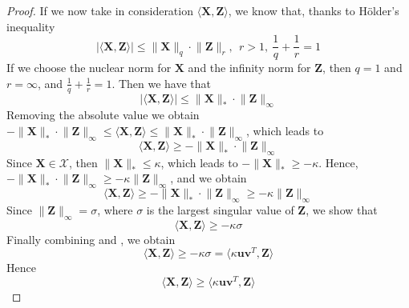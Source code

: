 \documentclass[12pt]{article}
\newcommand{\boldZ}{\mathbf{Z}}
\newcommand{\boldX}{\mathbf{X}}
\newcommand{\setX}{\mathcal{X}}
\newcommand{\boldu}{\mathbf{u}}
\newcommand{\boldv}{\mathbf{v}}
\begin{document}
\begin{proof}
If we now take in consideration $\langle \boldX, \boldZ \rangle$, we know that, thanks to H{\"o}lder's inequality
\begin{equation}
    \lvert \langle \boldX, \boldZ \rangle \rvert \leq \lVert \boldX \rVert_{q} \cdot \lVert \boldZ \rVert_{r}, \ \ r > 1, \ \frac{1}{q} + \frac{1}{r} = 1
\end{equation}
If we choose the nuclear norm for $\boldX$ and the infinity norm for $\boldZ$, then $q = 1$ and $r = \infty$, and $\frac{1}{q} + \frac{1}{r} = 1$. Then we have that
\begin{equation}
    \lvert \langle \boldX, \boldZ \rangle \rvert \leq \lVert \boldX \rVert_{*} \cdot \lVert \boldZ \rVert_{\infty}
\end{equation}
Removing the absolute value we obtain $-\lVert \boldX \rVert_{*} \cdot \lVert \boldZ \rVert_{\infty} \leq \langle \boldX, \boldZ \rangle \leq \lVert \boldX \rVert_{*} \cdot \lVert \boldZ \rVert_{\infty}$, which leads to
\begin{equation}
    \langle \boldX, \boldZ \rangle \geq - \lVert \boldX \rVert_{*} \cdot \lVert \boldZ \rVert_{\infty}
\end{equation}
Since $\boldX \in \setX$, then $\lVert \boldX \rVert_{*} \leq \kappa$, which leads to $-\lVert \boldX \rVert_{*} \geq -\kappa$. Hence, $-\lVert \boldX \rVert_{*} \cdot \lVert \boldZ \rVert_{\infty} \geq -\kappa \lVert \boldZ \rVert_{\infty}$, and we obtain
\begin{equation}
    \langle \boldX, \boldZ \rangle \geq -\lVert \boldX \rVert_{*} \cdot \lVert \boldZ \rVert_{\infty} \geq -\kappa \lVert \boldZ \rVert_{\infty}
\end{equation}
Since $\lVert \boldZ \rVert_{\infty} = \sigma$, where $\sigma$ is the largest singular value of $\boldZ$, we show that
\begin{equation} \label{eq:inner-x-z}
    \langle \boldX, \boldZ \rangle \geq - \kappa \sigma
\end{equation}
Finally combining  and , we obtain
\begin{equation}
    \langle \boldX, \boldZ \rangle \geq - \kappa \sigma = \langle \kappa \boldu \boldv^T, \boldZ \rangle
\end{equation}
Hence
\begin{equation}
    \langle \boldX, \boldZ \rangle \geq \langle \kappa \boldu \boldv^T, \boldZ \rangle
\end{equation}
\end{proof}
\end{document}
